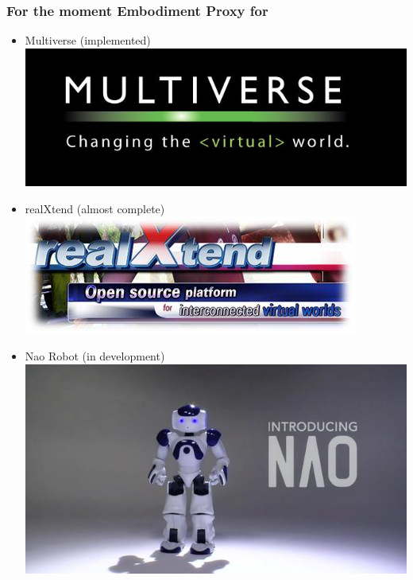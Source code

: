 \documentclass{beamer}
\begin{document}
\frame
{
  \frametitle{For the moment Embodiment Proxy for}

  \begin{itemize}
  \item<+-> Multiverse (implemented)
    \includegraphics[scale=0.2]{multiverse_logo_large.jpg}
  \item<+-> realXtend (almost complete)
    \includegraphics[scale=0.5]{realXtend_logo.jpg}
  \item<+-> Nao Robot (in development)
    \includegraphics[scale=0.2]{nao_logo.jpg}
  \end{itemize}
}
\end{document}
